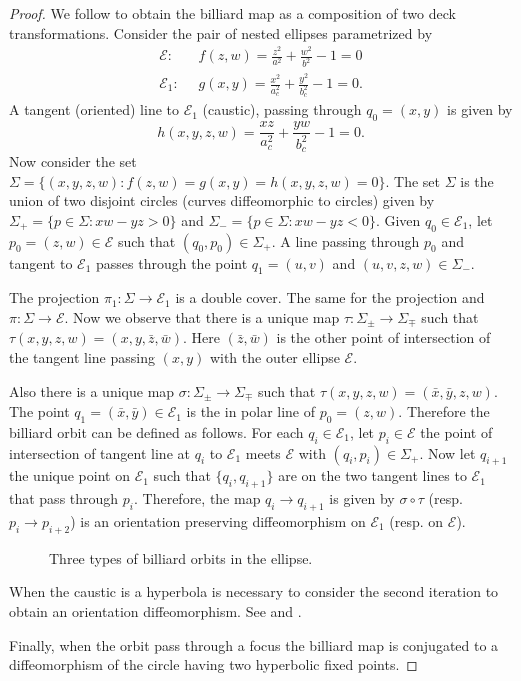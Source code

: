  \begin{proof} We follow \cite{bry} to obtain the billiard map as a composition of two deck transformations.  Consider the pair of nested   ellipses parametrized by \begin{align*}
     \mathcal{E}:&\;\; f(z,w)=\frac{z^2}{a^2}+\frac{w^2}{b^2}-1=0\\
     \mathcal{E}_1:&\;\; g(x,y)= \frac{x^2}{a_c^2}+\frac{y^2}{b_c^2}-1=0.
 \end{align*}
 A tangent (oriented) line to $\mathcal{E}_1$ (caustic), passing through $q_0=(x,y)$ is given by
 \[h(x,y,z,w) =\frac{xz}{a_c^2}+\frac{yw}{b_c^2}-1=0.\]
 Now consider the set
 $\Sigma= \{(x,y,z,w): f(z,w)=g(x,y)=h(x,y,z,w)=0\}.$  
 The set $\Sigma$ is the union of two disjoint circles (curves  diffeomorphic  to circles) given by
 $\Sigma_+=\{p\in \Sigma: xw-yz>0\} $ and
  $\Sigma_-=\{p\in \Sigma: xw-yz<0\}. $
  Given $q_0\in\mathcal{E}_1$, let $p_0=(z,w)\in \mathcal{E}$ such that $(q_0,p_0)\in\Sigma_+.$ A line passing through $p_0$ and tangent to $\mathcal{E}_1$ passes through the point $q_1=(u,v)$ and $(u,v,z,w)\in\Sigma_-.$
  
  The projection  $\pi_1:\Sigma \to \mathcal{E}_1$ is a double cover. The same for the projection
  and $\pi:\Sigma\to \mathcal{E}$. 
  Now we observe that there is a unique map $\tau:\Sigma_{\pm}\to \Sigma_{\mp}$ such that $\tau(x,y,z,w)=(x,y,\bar{z},\bar{w})$. Here $(\bar{z},\bar{w})$ is the other point of intersection of the tangent line passing $(x,y)$ with the outer ellipse $\mathcal{E}.$
  
Also there is a unique map $ \sigma:\Sigma_{\pm}\to \Sigma_{\mp}$ such that $\tau(x,y,z,w)=( \bar{x},\bar{y},z,w)$. The point $q_1=( \bar{x},\bar{y})\in\mathcal{E}_1$ is the in polar line of $p_0=(z,w).$ 
Therefore the billiard orbit can be defined as follows. For each $q_i\in \mathcal{E}_1$, let $p_i\in\mathcal{E}$ the point of intersection of tangent line at $q_i$ to $\mathcal{E}_1$ meets $\mathcal{E}$ with $(q_i,p_i)\in\Sigma_+.$ Now let $q_{i+1} $ the unique point on $\mathcal{E}_1$ such that $\{q_i,q_{i+1}\}$ are on the two tangent lines to $\mathcal{E}_1$ that pass through $p_i$. Therefore,   the map $q_i\to q_{i+1}$ is given by $\sigma\circ \tau $
  (resp. $p_i\to p_{i+2}$) is an orientation preserving diffeomorphism on $\mathcal{E}_1$ (resp. on $\mathcal{E}$).

\begin{figure}[H]
	\begin{center}
		\def\svgwidth{1.0\textwidth}
		
		\caption { Three types of billiard orbits in the ellipse.   \label{fig:caustic2}}
	\end{center}
\end{figure}

When the caustic is a hyperbola is necessary to consider the  second iteration to obtain an orientation diffeomorphism. See \cite{birkhoff} and \cite{kolod}.

Finally, when the orbit pass through a focus the billiard map is conjugated to a diffeomorphism of the circle having two hyperbolic fixed points.
 \end{proof}


